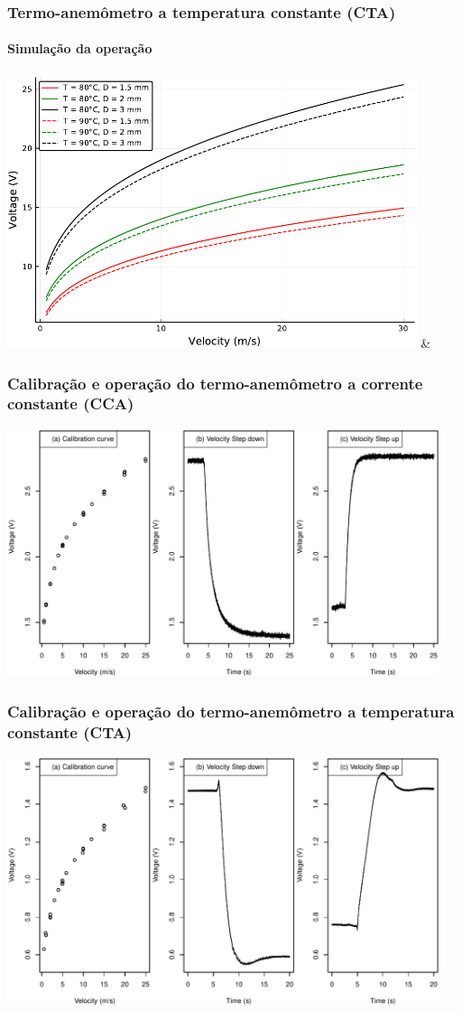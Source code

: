 \documentclass[12pt,handout]{beamer}
\begin{document}
\begin{frame}
  \frametitle{Termo-anemômetro a temperatura constante (CTA)}
  \framesubtitle{Simulação da operação}
 \centering
 \includegraphics[width=0.9\textwidth]{../../figures/CTA-Eo.pdf} & 
\end{frame}



\begin{frame}
  \frametitle{Calibração e operação do termo-anemômetro a corrente constante (CCA)}
  \centering
  \includegraphics[width=0.95\textwidth]{../../figures/cca-cal.pdf}

 
\end{frame}

\begin{frame}
  \frametitle{Calibração e operação do termo-anemômetro a temperatura constante (CTA)}
  \centering
  \includegraphics[width=0.95\textwidth]{../../figures/cta-cal.pdf}
 
\end{frame}
\end{document}
